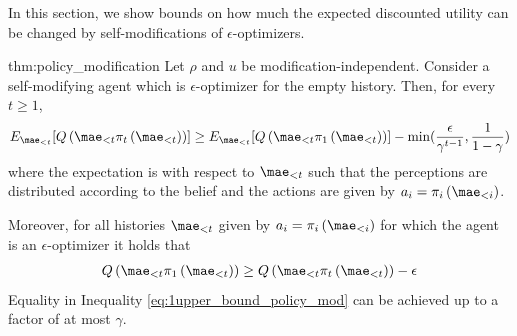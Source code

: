In this section, we show bounds on how much the expected discounted utility can be changed by self-modifications of $\epsilon$-optimizers.
\begin{repeatthm}{thm:policy_modification}
Let $\rho$ and $u$ be modification-independent. Consider a self-modifying agent which is $\epsilon$-optimizer for the empty history. Then, for every $t \geq 1$, \begin{gather}
E_{\mae_{<t}} [Q\left(\mae_{<t} \pi_{t}\left(\mae_{<t}\right)\right)] \geq E_{\mae_{<t}}[Q\left(\mae_{<t} \pi_{1}\left(\mae_{<t}\right)\right)] - \min(\frac{\epsilon}{\gamma^{t-1}}, \frac{1}{1-\gamma}) \label{eq:1upper_bound_policy_mod}
\end{gather}
where the expectation is with respect to $\mae_{<t}$ such that the perceptions are distributed according to the belief and the actions are given by $a_{i}=\pi_{i}\left(\mae_{<i}\right)$.

Moreover, for all histories $\mae_{<t}$ given by $a_{i}=\pi_{i}\left(\mae_{<i}\right)$ for which the agent is an $\epsilon$-optimizer it holds that
\begin{gather}
Q\left(\mae_{<t} \pi_{1}\left(\mae_{<t}\right)\right) \geq Q\left(\mae_{<t} \pi_{t}\left(\mae_{<t}\right)\right) - \epsilon \label{eq:1lower_bound_policy_mod}\\
\end{gather}
Equality in Inequality \eqref{eq:1upper_bound_policy_mod} can be achieved up to a factor of at most $\gamma$.
\end{repeatthm}
